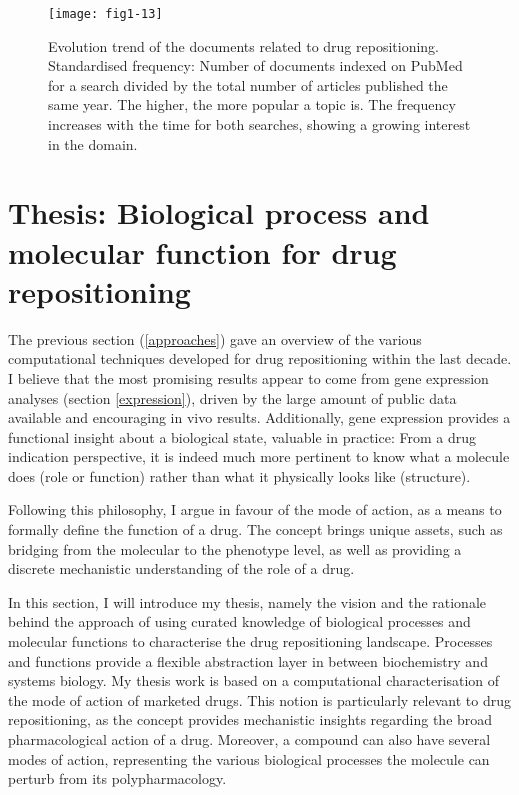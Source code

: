 \begin{figure}[ht]
    \centering
    \texttt{[image: fig1-13]}
    \caption{Evolution trend of the documents related to drug repositioning. Standardised frequency: Number of documents indexed on PubMed for a search divided by the total number of articles published the same year. The higher, the more popular a topic is. The  frequency increases with the time for both searches, showing a growing interest in the domain.}
    \label{fig1-13}
\end{figure}


\section{Thesis: Biological process and molecular function for drug repositioning}

The previous section (\ref{approaches}) gave an overview of the various computational techniques developed for drug repositioning within the last decade. I believe that the most promising results appear to come from gene expression analyses (section \ref{expression}), driven by the large amount of public data available and encouraging in vivo results. Additionally, gene expression provides a functional insight about a biological state, valuable in practice: From a drug indication perspective, it is indeed much more pertinent to know what a molecule does (role or function) rather than what it physically looks like (structure).

Following this philosophy, I argue in favour of the mode of action, as a means to formally define the function of a drug. The concept brings unique assets, such as bridging from the molecular to the phenotype level, as well as providing a discrete mechanistic understanding of the role of a drug.

In this section, I will introduce my thesis, namely the vision and the rationale behind the approach of using curated knowledge of biological processes and molecular functions to characterise the drug repositioning landscape. Processes and functions provide a flexible abstraction layer in between biochemistry and systems biology. My thesis work is based on a computational characterisation of the mode of action of marketed drugs. This notion is particularly relevant to drug repositioning, as the concept provides mechanistic insights regarding the broad pharmacological action of a drug. Moreover, a compound can also have several modes of action, representing the various biological processes the molecule can perturb from its polypharmacology.

